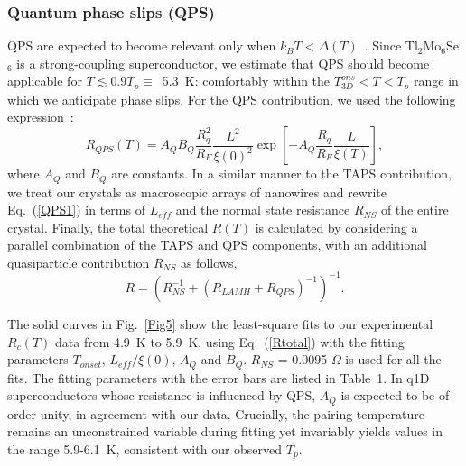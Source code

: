 \documentclass[prb,twocolumn,showpacs,preprintnumbers,amsmath,amssymb,floatfix,groupedaddress,superscriptaddress,aps,10pt]{revtex4-1}
\newcommand{\Tl}{Tl$_2$Mo$_6$Se$_6$}
\begin{document}
{{\subsubsection{Quantum phase slips (QPS)}
QPS are expected to become relevant only when $k_{B}T<\Delta(T)$~\cite{Cirillo2012}.  Since {\Tl} is a strong-coupling superconductor, we estimate that QPS should become applicable for $T\lesssim0.9T_p\equiv$~5.3~K: comfortably within the $T_{3D}^{ons}<T<T_p$ range in which we anticipate phase slips. For the QPS contribution, we used the following expression~\cite{Arutyunov2008}:
\begin{equation} \label{QPS1}
R_{QPS}(T)=A_{Q}B_{Q}\frac{R_{q}^{2}}{R_{F}}\frac{L^{2}}{\xi(0)^{2}}\exp\left[-A_{Q}\frac{R_{q}}{R_{F}}\frac{L}{\xi(T)}\right],
\end{equation}
where $A_{Q}$ and $B_{Q}$ are constants.  In a similar manner to the TAPS contribution, we treat our crystals as macroscopic arrays of nanowires and rewrite Eq.~(\ref{QPS1}) in terms of $L_{eff}$ and the normal state resistance $R_{NS}$ of the entire crystal. Finally, the total theoretical $R(T)$ is calculated by considering a parallel combination of the TAPS and QPS components, with an additional quasiparticle contribution $R_{NS}$ as follows,
\begin{equation} \label{Rtotal}
R=(R_{NS}^{-1}+(R_{LAMH}+R_{QPS})^{-1})^{-1}.
\end{equation} 

The solid curves in Fig.~\ref{Fig5} show the least-square fits to our experimental $R_c(T)$ data from 4.9~K to 5.9~K, using Eq.~(\ref{Rtotal}) with the fitting parameters $T_{onset}$, $L_{eff}/\xi(0)$, $A_{Q}$ and $B_{Q}$. $R_{NS}$ = 0.0095 $\Omega$ is used for all the fits. The fitting parameters with the error bars are listed in Table~1.  In q1D superconductors whose resistance is influenced by QPS, $A_{Q}$ is expected to be of order unity, in agreement with our data. Crucially, the pairing temperature remains an unconstrained variable during fitting yet invariably yields values in the range 5.9-6.1~K, consistent with our observed $T_p$.

}}
\end{document}
